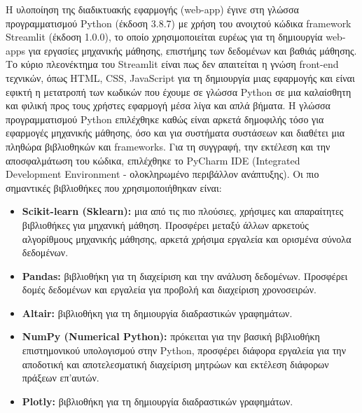 \noindent Η υλοποίηση της διαδικτυακής εφαρμογής (web-app) έγινε στη γλώσσα προγραμματισμού Python (έκδοση 3.8.7) με χρήση του ανοιχτού κώδικα framework Streamlit \cite{StreamlitFastestWay} (έκδοση 1.0.0), το οποίο χρησιμοποιείται ευρέως για τη δημιουργία web-apps για εργασίες μηχανικής μάθησης, επιστήμης των δεδομένων και βαθιάς μάθησης. Το κύριο πλεονέκτημα του Streamlit είναι πως δεν απαιτείται η γνώση front-end τεχνικών, όπως HTML, CSS, JavaScript για τη δημιουργία μιας εφαρμογής και είναι εφικτή η μετατροπή των κωδικών που έχουμε σε γλώσσα Python σε μια καλαίσθητη και φιλική προς τους χρήστες εφαρμογή μέσα λίγα και απλά βήματα. Η γλώσσα προγραμματισμού Python επιλέχθηκε καθώς είναι αρκετά δημοφιλής τόσο για εφαρμογές μηχανικής μάθησης, όσο και για συστήματα συστάσεων και διαθέτει μια πληθώρα βιβλιοθηκών και frameworks. Για τη συγγραφή, την εκτέλεση και την αποσφαλμάτωση του κώδικα, επιλέχθηκε το PyCharm IDE (Integrated Development Environment - ολοκληρωμένο περιβάλλον ανάπτυξης).
Οι πιο σημαντικές βιβλιοθήκες που χρησιμοποιήθηκαν είναι:
\begin{itemize}
	\item \textbf{Scikit-learn (Sklearn):} μια από τις πιο πλούσιες, χρήσιμες και απαραίτητες βιβλιοθήκες για μηχανική μάθηση. Προσφέρει μεταξύ άλλων αρκετούς αλγορίθμους μηχανικής μάθησης, αρκετά χρήσιμα εργαλεία και ορισμένα σύνολα δεδομένων.
	\item \textbf{Pandas:} βιβλιοθήκη για τη διαχείριση και την ανάλυση δεδομένων. Προσφέρει δομές δεδομένων και εργαλεία για προβολή και διαχείριση χρονοσειρών.
	\item \textbf{Altair:} βιβλιοθήκη για τη δημιουργία διαδραστικών γραφημάτων.
	\item \textbf{NumPy (Numerical Python):} πρόκειται για την βασική βιβλιοθήκη επιστημονικού υπολογισμού στην Python, προσφέρει διάφορα εργαλεία για την αποδοτική και αποτελεσματική διαχείριση μητρώων και εκτέλεση διάφορων πράξεων επ'αυτών.
	\item \textbf{Plotly:} βιβλιοθήκη για τη δημιουργία διαδραστικών γραφημάτων.
\end{itemize}
